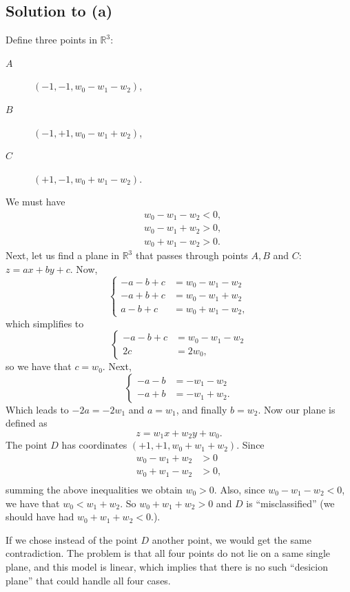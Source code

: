\documentclass[10pt]{article}
\begin{document}
\subsection*{Solution to (a)}
Define three points in $\mathbb{R}^3$:
\begin{description}
\item[$A$] $(-1, -1, w_0 - w_1 - w_2)$,
\item[$B$] $(-1, +1, w_0 - w_1 + w_2)$,
\item[$C$] $(+1, -1, w_0 + w_1 - w_2)$.
\end{description}
We must have
\begin{align*}
& w_0 - w_1 - w_2 < 0, \\
& w_0 - w_1 + w_2 > 0, \\
& w_0 + w_1 - w_2 > 0.
\end{align*}
Next, let us find a plane in $\mathbb{R}^3$ that passes through points $A, B$ and $C$: $z = ax + by + c$. Now,
\[
\begin{cases}
-a - b + c &= w_0 - w_1 - w_2 \\
-a + b + c &= w_0 - w_1 + w_2 \\
a - b + c  &= w_0 + w_1 - w_2,
\end{cases}
\]
which simplifies to
\[
\begin{cases}
-a - b + c &= w_0 - w_1 - w_2 \\
2c &= 2w_0,
\end{cases}
\]
so we have that $c = w_0$. Next,
\[
\begin{cases}
-a - b &= -w_1 - w_2 \\
-a + b & = -w_1 + w_2.
\end{cases}
\]
Which leads to $-2a = -2w_1$ and $a = w_1$, and finally $b = w_2$. Now our plane is defined as
\[
z = w_1x + w_2y + w_0.
\]
The point $D$ has coordinates $(+1, +1, w_0 + w_1 + w_2)$. Since
\begin{align*}
w_0 - w_1 + w_2 &> 0 \\
w_0 + w_1 - w_2 &> 0, \\
\end{align*}
summing the above inequalities we obtain $w_0 > 0$. Also, since $w_0 - w_1 - w_2 < 0$, we have that $w_0 < w_1 + w_2$. So $w_0 + w_1 + w_2 > 0$ and $D$ is ``misclassified'' (we should have had $w_0 + w_1 + w_2 < 0$.). 

If we chose instead of the point $D$ another point, we would get the same contradiction. The problem is that all four points do not lie on a same single plane, and this model is linear, which implies that there is no such ``desicion plane'' that could handle all four cases.
\end{document}
